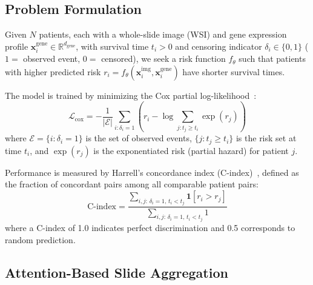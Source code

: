 \documentclass[10pt,twocolumn,letterpaper]{article}
\begin{document}
\subsection{Problem Formulation}

Given $N$ patients, each with a whole-slide image (WSI) and
gene expression profile
$\mathbf{x}_i^{\text{gene}} \in \mathbb{R}^{d_{\text{gene}}}$,
with survival time $t_i > 0$ and censoring indicator
$\delta_i \in \{0, 1\}$ ($1 =$ observed event, $0 =$ censored),
we seek a risk function $f_\theta$ such that patients with higher
predicted risk
$r_i = f_\theta(\mathbf{x}_i^{\text{img}},
\mathbf{x}_i^{\text{gene}})$ have shorter survival times.

The model is trained by minimizing the Cox partial
log-likelihood~\cite{cox1972}:
\begin{equation}
\mathcal{L}_{\text{cox}} = -\frac{1}{|\mathcal{E}|}
\sum_{i: \delta_i = 1}
\left( r_i - \log \sum_{j: t_j \geq t_i} \exp(r_j) \right)
\label{eq:cox}
\end{equation}
where $\mathcal{E} = \{i : \delta_i = 1\}$ is the set of
observed events, $\{j : t_j \geq t_i\}$ is the risk set at
time $t_i$, and $\exp(r_j)$ is the exponentiated risk (partial hazard) for patient $j$.

Performance is measured by Harrell's concordance index
(C-index)~\cite{harrell1996}, defined as the fraction of
concordant pairs among all comparable patient pairs:
\begin{equation}
\text{C-index} = \frac{\sum_{i,j:\, \delta_i=1,\, t_i < t_j}
\mathbf{1}[r_i > r_j]}
{\sum_{i,j:\, \delta_i=1,\, t_i < t_j} 1}
\label{eq:cindex}
\end{equation}
where a C-index of 1.0 indicates perfect discrimination and 0.5
corresponds to random prediction.

\subsection{Attention-Based Slide Aggregation}
\label{sec:clam}
\end{document}
